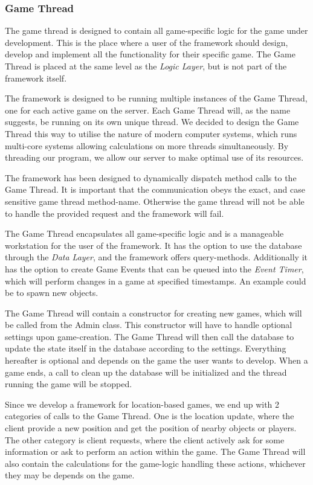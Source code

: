 \subsubsection{Game Thread}\label{designgamethread}
The game thread is designed to contain all game-specific logic for the game under development. This is the place where a user of the framework should design, develop and implement all the functionality for their specific game. The Game Thread is placed at the same level as the \textit{Logic Layer}, but is not part of the framework itself. 

The framework is designed to be running multiple instances of the Game Thread, one for each active game on the server. Each Game Thread will, as the name suggests, be running on its own unique thread. We decided to design the Game Thread this way to utilise the nature of modern computer systems, which runs multi-core systems allowing calculations on more threads simultaneously. By threading our program, we allow our server to make optimal use of its resources.

The framework has been designed to dynamically dispatch method calls to the Game Thread. It is important that the communication obeys the exact, and case sensitive game thread method-name. Otherwise the game thread will not be able to handle the provided request and the framework will fail. 

The Game Thread encapsulates all game-specific logic and is a manageable workstation for the user of the framework. It has the option to use the database through the \textit{Data Layer}, and the framework offers query-methods. Additionally it has the option to create Game Events that can be queued into the \textit{Event Timer}, which will perform changes in a game at specified timestamps. An example could be to spawn new objects.

The Game Thread will contain a constructor for creating new games, which will be called from the Admin class. This constructor will have to handle optional settings upon game-creation. The Game Thread will then call the database to update the state itself in the database according to the settings. Everything hereafter is optional and depends on the game the user wants to develop. When a game ends, a call to clean up the database will be initialized and the thread running the game will be stopped.

Since we develop a framework for location-based games, we end up with 2 categories of calls to the Game Thread. One is the location update, where the client provide a new position and get the position of nearby objects or players. The other category is client requests, where the client actively ask for some information or ask to perform an action within the game. The Game Thread will also contain the calculations for the game-logic handling these actions, whichever they may be depends on the game. 